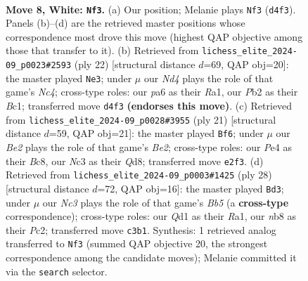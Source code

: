 \documentclass[11pt]{article}
\begin{document}
\clearpage

\begin{figure}[p]\centering
\begin{subfigure}{0.46\textwidth}\centering
\resizebox{\linewidth}{!}{%
\newchessgame
\chessboard[
  setfen={rnbqk2r/1p2bppp/p2p1n2/4p3/3NP3/2N5/PPP1BPPP/R1BQ1RK1 w kq - 2 8},
  showmover=false,
  pgfstyle=straightmove, color=movearrow, markmove={d4-f3}
]}
\caption{}
\end{subfigure}\hfill
\begin{subfigure}{0.46\textwidth}\centering
\resizebox{\linewidth}{!}{%
\newchessgame
\chessboard[
  setfen={r2qr1k1/pp2bppp/3p1n2/2pPnb2/P1N5/2N5/1PP1BPPP/R1BQ1RK1 w - - 1 12},
  showmover=false,
  pgfstyle=straightmove, color=movearrow, markmove={c4-e3}
]}
\caption{}
\end{subfigure}
\\[4pt]
\begin{subfigure}{0.46\textwidth}\centering
\resizebox{\linewidth}{!}{%
\newchessgame
\chessboard[
  setfen={r1bq1rk1/2p1bppp/p1n5/1p1n4/3P4/1B3N2/PP3PPP/RNBQR1K1 b - - 0 11},
  showmover=false,
  pgfstyle=straightmove, color=movearrow, markmove={e7-f6}
]}
\caption{}
\end{subfigure}\hfill
\begin{subfigure}{0.46\textwidth}\centering
\resizebox{\linewidth}{!}{%
\newchessgame
\chessboard[
  setfen={r1b2rk1/ppq1bpp1/4pn1p/1B2p3/P3P3/2N5/1PPBQPPP/R2R2K1 w - - 2 15},
  showmover=false,
  pgfstyle=straightmove, color=movearrow, markmove={b5-d3}
]}
\caption{}
\end{subfigure}
\caption{\textbf{Move 8, White: \texttt{Nf3}.} (a) Our position; Melanie plays \texttt{Nf3} (\texttt{d4f3}). Panels (b)--(d) are the retrieved master positions whose correspondence most drove this move (highest QAP objective among those that transfer to it). (b) Retrieved from \texttt{lichess\_elite\_2024-09\_p0023\#2593} (ply 22) [structural distance $d$=69, QAP obj=20]: the master played \texttt{Ne3}; under $\mu$ our \emph{Nd4} plays the role of that game's \emph{Nc4}; cross-type roles: our \emph{p}a6 as their \emph{R}a1, our \emph{P}b2 as their \emph{B}c1; transferred move \texttt{d4f3} \textbf{(endorses this move)}. (c) Retrieved from \texttt{lichess\_elite\_2024-09\_p0028\#3955} (ply 21) [structural distance $d$=59, QAP obj=21]: the master played \texttt{Bf6}; under $\mu$ our \emph{Be2} plays the role of that game's \emph{Be2}; cross-type roles: our \emph{P}e4 as their \emph{B}c8, our \emph{N}c3 as their \emph{Q}d8; transferred move \texttt{e2f3}. (d) Retrieved from \texttt{lichess\_elite\_2024-09\_p0003\#1425} (ply 28) [structural distance $d$=72, QAP obj=16]: the master played \texttt{Bd3}; under $\mu$ our \emph{Nc3} plays the role of that game's \emph{Bb5} (a \textbf{cross-type} correspondence); cross-type roles: our \emph{Q}d1 as their \emph{R}a1, our \emph{n}b8 as their \emph{P}c2; transferred move \texttt{c3b1}. Synthesis: 1 retrieved analog transferred to \texttt{Nf3} (summed QAP objective 20, the strongest correspondence among the candidate moves); Melanie committed it via the \texttt{search} selector.}
\label{fig:thought-m14}
\end{figure}
\end{document}
